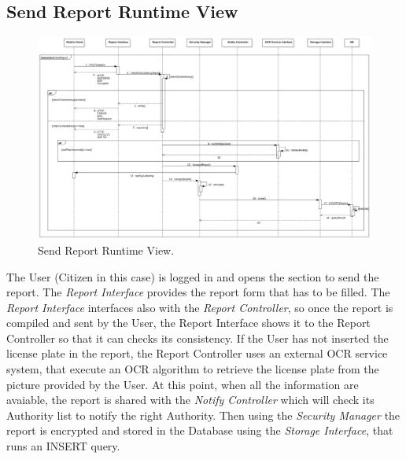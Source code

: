 \documentclass{report}
\begin{document}
\subsection{Send Report Runtime View}
\begin{figure}[H]
	\begin{center}
	\includegraphics[width=\textwidth]{img/SendReport1.png}
    \end{center}
    \label{fig:SendReportSD}
	\caption{Send Report Runtime View.}
\end{figure}
The User (Citizen in this case) is logged in and opens the section to send the report. The \textit{Report Interface} provides the report form that has to be filled. The \textit{Report Interface} interfaces also with the \textit{Report Controller}, so once the report is compiled and sent by the User, the Report Interface shows it to the Report Controller so that it can checks its consistency. 
If the User has not inserted the license plate in the report, the Report Controller uses an external OCR service system, that execute an OCR algorithm to retrieve the license plate from the picture provided by the User.
At this point, when all the information are avaiable, the report is shared with the \textit{Notify Controller} which will check its Authority list to notify the right Authority.
Then using the \textit{Security Manager} the report is encrypted and stored in the Database using the \textit{Storage Interface}, that runs an INSERT query. 
\newpage
\end{document}
